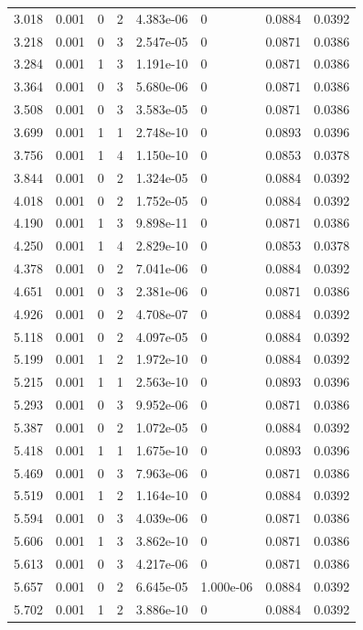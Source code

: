\documentclass[preview]{standalone}
\begin{document}
{{\begin{tabular}{L{1.2cm}C{1.2cm} C{0.3cm}C{0.5cm} C{1.4cm}C{1.4cm} C{1.4cm}C{1.4cm}}
  3.018  &  0.001  & 0     &  2 &  4.383e-06  & 0  & 0.0884 &  0.0392   \\ 
  3.218  &  0.001  & 0     &  3 &  2.547e-05  & 0  & 0.0871 &  0.0386   \\ 
  3.284  &  0.001  & 1     &  3 &  1.191e-10  & 0  & 0.0871 &  0.0386   \\ 
  3.364  &  0.001  & 0     &  3 &  5.680e-06  & 0  & 0.0871 &  0.0386   \\ 
  3.508  &  0.001  & 0     &  3 &  3.583e-05  & 0  & 0.0871 &  0.0386   \\ 
  3.699  &  0.001  & 1     &  1 &  2.748e-10  & 0  & 0.0893 &  0.0396   \\ 
  3.756  &  0.001  & 1     &  4 &  1.150e-10  & 0  & 0.0853 &  0.0378   \\ 
  3.844  &  0.001  & 0     &  2 &  1.324e-05  & 0  & 0.0884 &  0.0392   \\ 
  4.018  &  0.001  & 0     &  2 &  1.752e-05  & 0  & 0.0884 &  0.0392   \\ 
  4.190  &  0.001  & 1     &  3 &  9.898e-11  & 0  & 0.0871 &  0.0386   \\ 
  4.250  &  0.001  & 1     &  4 &  2.829e-10  & 0  & 0.0853 &  0.0378   \\ 
  4.378  &  0.001  & 0     &  2 &  7.041e-06  & 0  & 0.0884 &  0.0392   \\ 
  4.651  &  0.001  & 0     &  3 &  2.381e-06  & 0  & 0.0871 &  0.0386   \\ 
  4.926  &  0.001  & 0     &  2 &  4.708e-07  & 0  & 0.0884 &  0.0392   \\ 
  5.118  &  0.001  & 0     &  2 &  4.097e-05  & 0  & 0.0884 &  0.0392   \\ 
  5.199  &  0.001  & 1     &  2 &  1.972e-10  & 0  & 0.0884 &  0.0392   \\ 
  5.215  &  0.001  & 1     &  1 &  2.563e-10  & 0  & 0.0893 &  0.0396   \\ 
  5.293  &  0.001  & 0     &  3 &  9.952e-06  & 0  & 0.0871 &  0.0386   \\ 
  5.387  &  0.001  & 0     &  2 &  1.072e-05  & 0  & 0.0884 &  0.0392   \\ 
  5.418  &  0.001  & 1     &  1 &  1.675e-10  & 0  & 0.0893 &  0.0396   \\ 
  5.469  &  0.001  & 0     &  3 &  7.963e-06  & 0  & 0.0871 &  0.0386   \\ 
  5.519  &  0.001  & 1     &  2 &  1.164e-10  & 0  & 0.0884 &  0.0392   \\ 
  5.594  &  0.001  & 0     &  3 &  4.039e-06  & 0  & 0.0871 &  0.0386   \\ 
  5.606  &  0.001  & 1     &  3 &  3.862e-10  & 0  & 0.0871 &  0.0386   \\ 
  5.613  &  0.001  & 0     &  3 &  4.217e-06  & 0  & 0.0871 &  0.0386   \\ 
  5.657  &  0.001  & 0     &  2 &  6.645e-05  & 1.000e-06  & 0.0884 &  0.0392   \\ 
  5.702  &  0.001  & 1     &  2 &  3.886e-10  & 0  & 0.0884 &  0.0392   \\ 
\hline 
\end{tabular} 

}}
\end{document}
